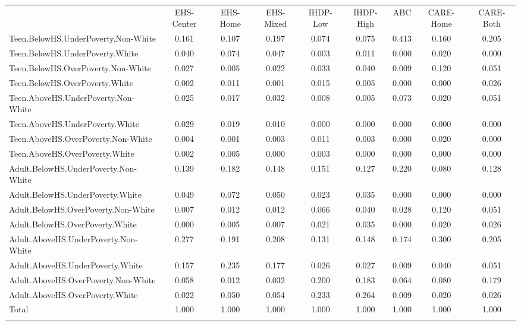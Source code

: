 \begin{tabular}{lcccccccc}
\hline \noalign{\smallskip} & EHS-Center & EHS-Home & EHS-Mixed & IHDP-Low & IHDP-High & ABC & CARE-Home & CARE-Both\\
\noalign{\smallskip}\hline \noalign{\smallskip}Teen.BelowHS.UnderPoverty.Non-White & 0.161 & 0.107 & 0.197 & 0.074 & 0.075 & 0.413 & 0.160 & 0.205\\
Teen.BelowHS.UnderPoverty.White & 0.040 & 0.074 & 0.047 & 0.003 & 0.011 & 0.000 & 0.020 & 0.000\\
Teen.BelowHS.OverPoverty.Non-White & 0.027 & 0.005 & 0.022 & 0.033 & 0.040 & 0.009 & 0.120 & 0.051\\
Teen.BelowHS.OverPoverty.White & 0.002 & 0.011 & 0.001 & 0.015 & 0.005 & 0.000 & 0.000 & 0.026\\
Teen.AboveHS.UnderPoverty.Non-White & 0.025 & 0.017 & 0.032 & 0.008 & 0.005 & 0.073 & 0.020 & 0.051\\
Teen.AboveHS.UnderPoverty.White & 0.029 & 0.019 & 0.010 & 0.000 & 0.000 & 0.000 & 0.000 & 0.000\\
Teen.AboveHS.OverPoverty.Non-White & 0.004 & 0.001 & 0.003 & 0.011 & 0.003 & 0.000 & 0.020 & 0.000\\
Teen.AboveHS.OverPoverty.White & 0.002 & 0.005 & 0.000 & 0.003 & 0.000 & 0.000 & 0.000 & 0.000\\
Adult.BelowHS.UnderPoverty.Non-White & 0.139 & 0.182 & 0.148 & 0.151 & 0.127 & 0.220 & 0.080 & 0.128\\
Adult.BelowHS.UnderPoverty.White & 0.049 & 0.072 & 0.050 & 0.023 & 0.035 & 0.000 & 0.000 & 0.000\\
Adult.BelowHS.OverPoverty.Non-White & 0.007 & 0.012 & 0.012 & 0.066 & 0.040 & 0.028 & 0.120 & 0.051\\
Adult.BelowHS.OverPoverty.White & 0.000 & 0.005 & 0.007 & 0.021 & 0.035 & 0.000 & 0.020 & 0.026\\
Adult.AboveHS.UnderPoverty.Non-White & 0.277 & 0.191 & 0.208 & 0.131 & 0.148 & 0.174 & 0.300 & 0.205\\
Adult.AboveHS.UnderPoverty.White & 0.157 & 0.235 & 0.177 & 0.026 & 0.027 & 0.009 & 0.040 & 0.051\\
Adult.AboveHS.OverPoverty.Non-White & 0.058 & 0.012 & 0.032 & 0.200 & 0.183 & 0.064 & 0.080 & 0.179\\
Adult.AboveHS.OverPoverty.White & 0.022 & 0.050 & 0.054 & 0.233 & 0.264 & 0.009 & 0.020 & 0.026\\
Total & 1.000 & 1.000 & 1.000 & 1.000 & 1.000 & 1.000 & 1.000 & 1.000\\
\noalign{\smallskip}\hline\end{tabular}\\
